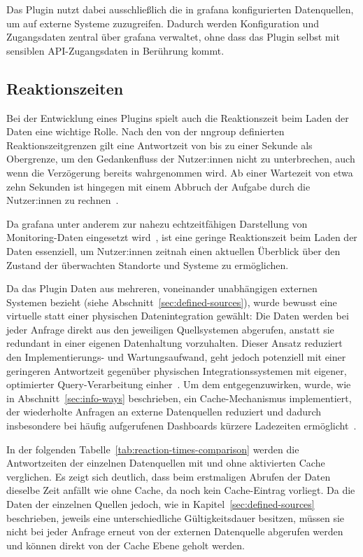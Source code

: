 Das Plugin nutzt dabei ausschließlich die in \gls{grafana} konfigurierten Datenquellen, um auf
externe Systeme zuzugreifen. Dadurch werden Konfiguration und Zugangsdaten zentral über
\gls{grafana} verwaltet, ohne dass das Plugin selbst mit sensiblen API-Zugangsdaten in Berührung
kommt.

\subsection{Reaktionszeiten}
\label{subsec:reaction-times}

Bei der Entwicklung eines Plugins spielt auch die Reaktionszeit beim Laden der Daten eine wichtige
Rolle. Nach den von der \gls{nngroup} definierten Reaktionszeitgrenzen gilt eine Antwortzeit von bis
zu einer Sekunde als Obergrenze, um den Gedankenfluss der Nutzer:innen nicht zu unterbrechen, auch
wenn die Verzögerung bereits wahrgenommen wird. Ab einer Wartezeit von etwa zehn Sekunden ist
hingegen mit einem Abbruch der Aufgabe durch die Nutzer:innen zu rechnen~\cite{nielsen2026responsetimes}.

Da \gls{grafana} unter anderem zur nahezu echtzeitfähigen Darstellung von Monitoring-Daten
eingesetzt wird~\cite{VBondar2025}, ist eine geringe Reaktionszeit beim Laden der Daten essenziell,
um Nutzer:innen zeitnah einen aktuellen Überblick über den Zustand der überwachten Standorte und
Systeme zu ermöglichen.

Da das Plugin Daten aus mehreren, voneinander unabhängigen externen Systemen bezieht (siehe
Abschnitt~\ref{sec:defined-sources}), wurde bewusst eine virtuelle statt einer physischen
Datenintegration gewählt: Die Daten werden bei jeder Anfrage direkt aus den jeweiligen
Quellsystemen abgerufen, anstatt sie redundant in einer eigenen Datenhaltung vorzuhalten. Dieser
Ansatz reduziert den Implementierungs- und Wartungsaufwand, geht jedoch potenziell mit einer
geringeren Antwortzeit gegenüber physischen Integrationssystemen mit eigener,
optimierter Query-Verarbeitung einher~\cite{Putrama2024}. Um dem entgegenzuwirken, wurde, wie in
Abschnitt~\ref{sec:info-ways} beschrieben, ein Cache-Mechanismus implementiert, der wiederholte
Anfragen an externe Datenquellen reduziert und dadurch insbesondere bei häufig aufgerufenen
Dashboards kürzere Ladezeiten ermöglicht~\cite{grafana2026datasourcecaching}.

In der folgenden Tabelle~\ref{tab:reaction-times-comparison} werden die Antwortzeiten der
einzelnen Datenquellen mit und ohne aktivierten Cache verglichen. Es zeigt sich deutlich, dass
beim erstmaligen Abrufen der Daten dieselbe Zeit anfällt wie ohne Cache, da noch kein
Cache-Eintrag vorliegt. Da die Daten der einzelnen Quellen jedoch, wie in
Kapitel~\ref{sec:defined-sources} beschrieben, jeweils eine unterschiedliche Gültigkeitsdauer
besitzen, müssen sie nicht bei jeder Anfrage erneut von der externen Datenquelle abgerufen werden und können
direkt von der Cache Ebene geholt werden.

